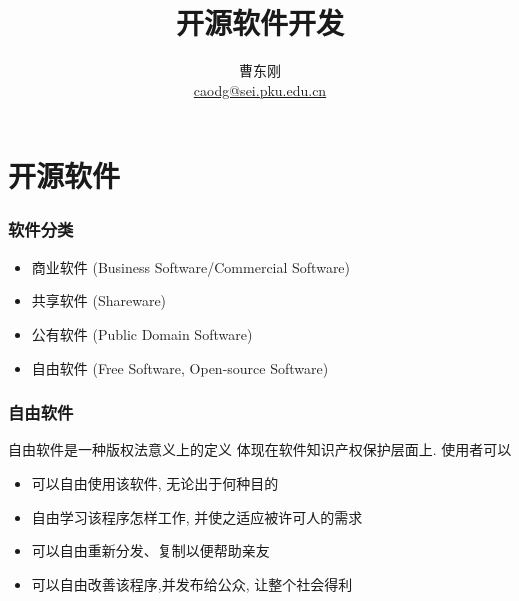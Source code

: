 \documentclass[compress]{beamer}
\begin{document}
					
\title{开源软件开发}

\author[\href{http://c.pku.edu.cn/}{http://c.pku.edu.cn/}]
{曹东刚\\\href{mailto:caodg@sei.pku.edu.cn}{caodg@sei.pku.edu.cn}}


\date{}


\begin{frame}
	\titlepage
\end{frame}

\section{开源软件}

\begin{frame}
\frametitle{软件分类}
\begin{itemize}
\item 商业软件 (Business Software/Commercial Software)
\item 共享软件 (Shareware)
\item 公有软件 (Public Domain Software)
\item 自由软件 (Free Software, Open-source Software)
\end{itemize}


\end{frame}

\begin{frame}
\frametitle{自由软件}
\begin{block}{自由软件是一种版权法意义上的定义}
体现在软件知识产权保护层面上. 使用者可以
\begin{itemize}
\item 可以自由使用该软件, 无论出于何种目的
\item 自由学习该程序怎样工作, 并使之适应被许可人的需求
\item 可以自由重新分发、复制以便帮助亲友
\item 可以自由改善该程序,并发布给公众, 让整个社会得利
\end{itemize}
\end{block}

\end{frame}
\end{document}
